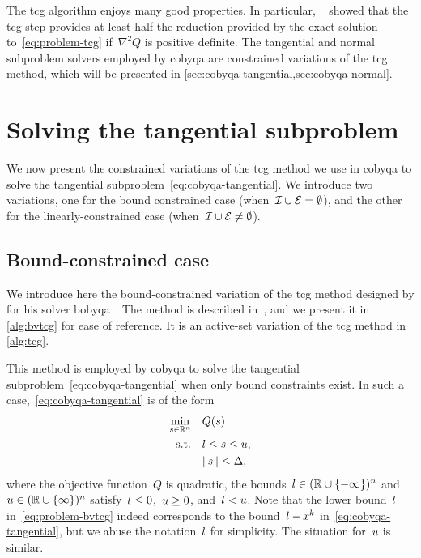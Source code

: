 The \gls{tcg} algorithm enjoys many good properties.
In particular, \citeauthor{Yuan_2000}~\cite{Yuan_2000} showed that the \gls{tcg} step provides at least half the reduction provided by the exact solution to~\cref{eq:problem-tcg} if~$\nabla^2 Q$ is positive definite.
The tangential and normal subproblem solvers employed by \gls{cobyqa} are constrained variations of the \gls{tcg} method,  which will be presented in \cref{sec:cobyqa-tangential,sec:cobyqa-normal}.

\section{Solving the tangential subproblem}
\label{sec:cobyqa-tangential}

We now present the constrained variations of the \gls{tcg} method we use in \gls{cobyqa} to solve the tangential subproblem~\cref{eq:cobyqa-tangential}.
We introduce two variations, one for the bound constrained case (when~$\mathcal{I} \cup \mathcal{E} = \emptyset$), and the other for the linearly-constrained case (when~$\mathcal{I} \cup \mathcal{E} \neq \emptyset$).

\subsection{Bound-constrained case}

We introduce here the bound-constrained variation of the \gls{tcg} method designed by \citeauthor{Powell_2009} for his solver \gls{bobyqa}~\cite{Powell_2009}.
The method is described in~\cite[\S~3]{Powell_2009}, and we present it in \cref{alg:bvtcg} for ease of reference.
It is an active-set variation of the \gls{tcg} method in \cref{alg:tcg}.

This method is employed by \gls{cobyqa} to solve the tangential subproblem~\cref{eq:cobyqa-tangential} when only bound constraints exist.
In such a case,~\cref{eq:cobyqa-tangential} is of the form
\begin{subequations}
    \label{eq:problem-bvtcg}
    \begin{align}
        \min_{\sstep \in \R^n}  & \quad Q(\sstep) \label{eq:problem-bvtcg-obj}\\
        \text{s.t.}             & \quad \xl \le \sstep \le \xu,\\
                                & \quad \norm{\sstep} \le \rad,
    \end{align}
\end{subequations}
where the objective function~$Q$ is quadratic, the bounds~$l \in (\mathbb{R} \cup \{-\infty\})^n$ and~$u \in (\mathbb{R} \cup \{\infty\})^n$ satisfy~$l \le 0$,~$u \ge 0$, and~$l < u$.
Note that the lower bound~$l$ in~\cref{eq:problem-bvtcg} indeed corresponds to the bound~$\xl - \iter[k]$ in~\cref{eq:cobyqa-tangential}, but we abuse the notation~$l$ for simplicity.
The situation for~$u$ is similar.

